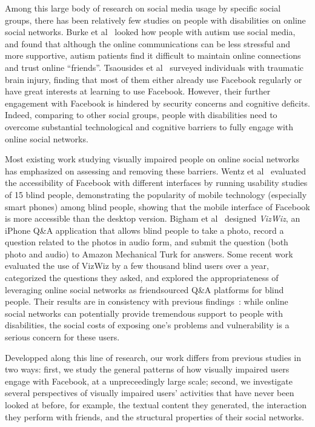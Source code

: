\documentclass{sigchi}
\begin{document}
Among this large body of research on social media usage by specific social groups, there has been relatively few studies on people with disabilities on online social networks. Burke et al~\cite{burke:2010} looked how people with autism use social media, and found that although the online communications can be less stressful and more supportive, autism patients find it difficult to maintain online connections and trust online ``friends''. Tsaousides et al~\cite{tsaousides2011} surveyed individuals with traumatic brain injury, finding that most of them either already use Facebook regularly or have great interests at learning to use Facebook. However, their further engagement with Facebook is hindered by security concerns and cognitive deficits. Indeed, comparing to other social groups, people with disabilities need to overcome substantial technological and cognitive barriers to fully engage with online social networks. 

Most existing work studying visually impaired people on online social networks has emphasized on assessing and removing these barriers. Wentz et al~\cite{wentz2011} evaluated the accessibility of Facebook with different interfaces by running usability studies of 15 blind people, demonstrating the popularity of mobile technology (especially smart phones) among blind people, showing that the mobile interface of Facebook is more accessible than the desktop version.   Bigham et al~\cite{bigham2010} designed \emph{VizWiz}, an iPhone  Q\&A application that allows blind people to take a photo, record a question related to the photos in audio form, and submit the question (both photo and audio) to Amazon Mechanical Turk for answers. Some recent work~\cite{brady2013chi, brady2013cscw} evaluated the use of VizWiz by a few thousand blind users over a year, categorized the questions they asked, and explored the appropriateness of leveraging online social networks as friendsourced Q\&A platforms for blind people. Their results are in consistency with previous findings~\cite{burke:2010,tsaousides2011}: while online social networks can potentially provide tremendous support to people with disabilities, the social costs of exposing one's problems and vulnerability is a serious concern for these users. 

Developped along this line of research, our work differs from previous studies in two ways: first, we study  the general patterns of how visually impaired users engage with Facebook, at a unpreceedingly large scale;  second, we investigate several perspectives of visually impaired users' activities that have never been looked at before, for example, the textual content they generated, the interaction they perform with friends, and the structural properties of their social networks. 
\end{document}
